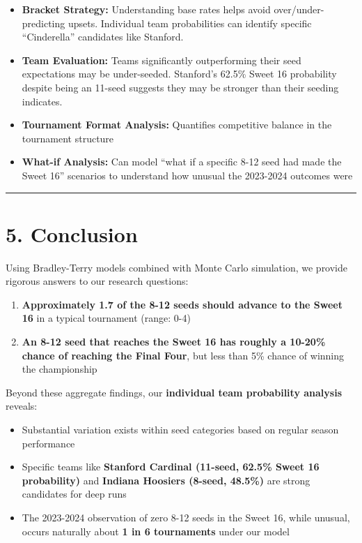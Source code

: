 \documentclass[
]{article}
\providecommand{\tightlist}{%
  \setlength{\itemsep}{0pt}\setlength{\parskip}{0pt}}
\begin{document}
\begin{itemize}
\tightlist
\item
  \textbf{Bracket Strategy:} Understanding base rates helps avoid
  over/under-predicting upsets. Individual team probabilities can
  identify specific ``Cinderella'' candidates like Stanford.
\item
  \textbf{Team Evaluation:} Teams significantly outperforming their seed
  expectations may be under-seeded. Stanford's 62.5\% Sweet 16
  probability despite being an 11-seed suggests they may be stronger
  than their seeding indicates.
\item
  \textbf{Tournament Format Analysis:} Quantifies competitive balance in
  the tournament structure
\item
  \textbf{What-if Analysis:} Can model ``what if a specific 8-12 seed
  had made the Sweet 16'' scenarios to understand how unusual the
  2023-2024 outcomes were
\end{itemize}

\begin{center}\rule{0.5\linewidth}{0.5pt}\end{center}

\section{5. Conclusion}\label{conclusion}

Using Bradley-Terry models combined with Monte Carlo simulation, we
provide rigorous answers to our research questions:

\begin{enumerate}
\def\labelenumi{\arabic{enumi}.}
\tightlist
\item
  \textbf{Approximately 1.7 of the 8-12 seeds should advance to the
  Sweet 16} in a typical tournament (range: 0-4)
\item
  \textbf{An 8-12 seed that reaches the Sweet 16 has roughly a 10-20\%
  chance of reaching the Final Four}, but less than 5\% chance of
  winning the championship
\end{enumerate}

Beyond these aggregate findings, our \textbf{individual team probability
analysis} reveals:

\begin{itemize}
\tightlist
\item
  Substantial variation exists within seed categories based on regular
  season performance
\item
  Specific teams like \textbf{Stanford Cardinal (11-seed, 62.5\% Sweet
  16 probability)} and \textbf{Indiana Hoosiers (8-seed, 48.5\%)} are
  strong candidates for deep runs
\item
  The 2023-2024 observation of zero 8-12 seeds in the Sweet 16, while
  unusual, occurs naturally about \textbf{1 in 6 tournaments} under our
  model
\end{itemize}
\end{document}
